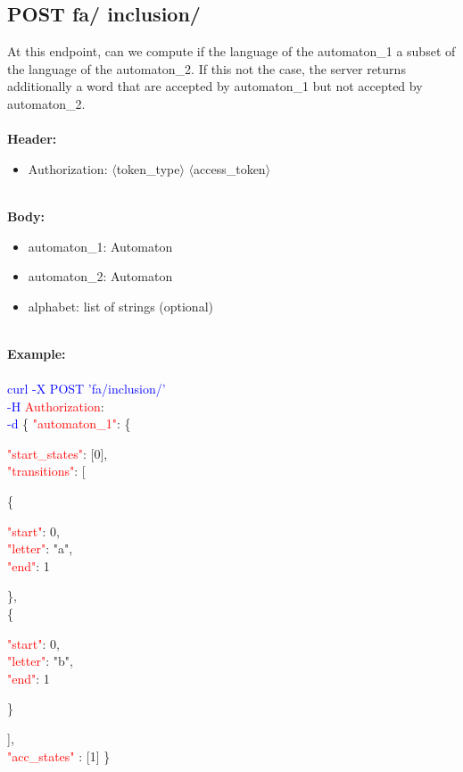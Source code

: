 \subsection{POST fa/ inclusion/}
At this endpoint, can we compute if the language of the automaton\_1 a subset of the language of the automaton\_2. If this not the case, the server returns additionally a word that are accepted by automaton\_1 but not accepted by automaton\_2. \\
\ \\
\textbf{Header:}
\begin{itemize}
    \item Authorization: $\langle$token\_type$\rangle$ $\langle$access\_token$\rangle$
\end{itemize}
\ \\
\textbf{Body:}
\begin{itemize}
    \item automaton\_1: Automaton
     \item automaton\_2: Automaton
    \item alphabet: list of strings (optional)
\end{itemize}
\ \\
\textbf{Example:} \\
\ \\
\textcolor{blue}{curl -X POST '\BaseURL fa/inclusion/'\\
-H} \textcolor{red}{Authorization}: \Auth \\
\textcolor{blue}{-d} \{ 
     \textcolor{red}{"automaton\_1"}: \{
     \begin{adjustwidth}{7.5 mm}{0 cm}
     \begin{adjustwidth}{7.5 mm}{0 cm}
            \textcolor{red}{"start\_states"}: [0],\\
            \textcolor{red}{"transitions"}: [
            \begin{adjustwidth}{7.5 mm}{0 cm}
            \{
               \begin{adjustwidth}{7.5 mm}{0 cm}
                    \textcolor{red}{"start"}: 0,\\
                    \textcolor{red}{"letter"}: "a",\\
                    \textcolor{red}{"end"}: 1
               \end{adjustwidth}
            \},\\
            \{
               \begin{adjustwidth}{7.5 mm}{0 cm}
                    \textcolor{red}{"start"}: 0,\\
                    \textcolor{red}{"letter"}: "b",\\
                    \textcolor{red}{"end"}: 1
               \end{adjustwidth}
            \}
            \end{adjustwidth}
            ],\\
        \textcolor{red}{"acc\_states" }: [1]  \}
    \end{adjustwidth}
    \end{adjustwidth}
